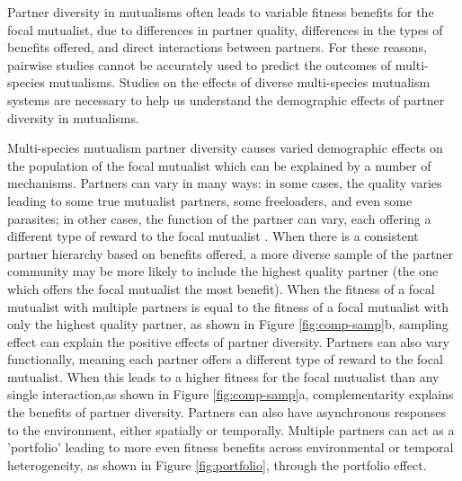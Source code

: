 \documentclass[12pt,a4paper]{article}
\begin{document}
Partner diversity in mutualisms often leads to variable fitness benefits for the focal mutualist\cite{Afkhami2014, Palmer2010}, due to differences in partner quality\cite{Bascompte2019,Stanton2013,Frederickson2013,Jones2015, Ness2006}, differences in the types of benefits offered\cite{Kiers2003,Afkhami2014}, and direct interactions between partners\cite{Sun2019,Heath2009,Heath2014,Grutter2003}.
For these reasons, pairwise studies cannot be accurately used to predict the outcomes of multi-species mutualisms\cite{Palmer2010, Stanton2013, Chamberlain2014, Song2020}.
Studies on the effects of diverse multi-species mutualism systems are necessary to help us understand the demographic effects of partner diversity in mutualisms\cite{Bascompte2019}. 

Multi-species mutualism partner diversity causes varied demographic effects on the population of the focal mutualist which can be explained by a number of mechanisms.
Partners can vary in many ways: in some cases, the quality varies leading to some true mutualist partners, some freeloaders, and even some parasites\cite{Bronstein1994,Bronstein2001a,Afkhami2014,Song2020,West2007,Frederickson2013,Jones2015}; in other cases, the function of the partner can vary, each offering a different type of reward to the focal mutualist \cite{Stanton2003}.
When there is a consistent partner hierarchy based on benefits offered, a more diverse sample of the partner community may be more likely to include the highest quality partner (the one which offers the focal mutualist the most benefit)\cite{Frederickson2013}.
When the fitness of a focal mutualist with multiple partners is equal to the fitness of a focal mutualist with only the highest quality partner, as shown in Figure \ref{fig:comp-samp}b, sampling effect can explain the positive effects of partner diversity\cite{Batstone2018}. 
Partners can also vary functionally, meaning each partner offers a different type of reward to the focal mutualist\cite{Stachowicz2005,Bronstein2006,Stanton2003}.
When this leads to a higher fitness for the focal mutualist than any single interaction,as shown in Figure \ref{fig:comp-samp}a, complementarity explains the benefits of partner diversity\cite{Batstone2018}. 
Partners can also have asynchronous responses to the environment, either spatially\cite{Ollerton2006} or temporally\cite{Alarcon2008}.
Multiple partners can act as a 'portfolio' leading to more even fitness benefits across environmental or temporal heterogeneity, as shown in Figure \ref{fig:portfolio}, through the portfolio effect\cite{Batstone2018,Lazaro2022}.
\end{document}
